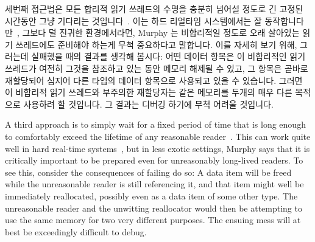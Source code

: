 세번째 접근법은 모든 합리적 읽기 쓰레드의 수명을 충분히 넘어설 정도로 긴 고정된
시간동안 그냥 기다리는 것입니다~\cite{Jacobson93,AjuJohn95}.
이는 하드 리얼타임 시스템에서는 잘 동작합니다만~\cite{YuxinRen2018RTRCU},
그보다 덜 진귀한 환경에서라면, Murphy 는 비합리적일 정도로 오래 살아있는 읽기
쓰레드에도 준비해야 하는게 무척 중요하다고 말합니다.
이를 자세히 보기 위해, 그러는데 실패했을 때의 결과를 생각해 봅시다:
어떤 데이터 항목은 이 비합리적인 읽기 쓰레드가 여전히 그것을 참조하고 있는 동안
메모리 해제될 수 있고, 그 항목은 곧바로 재할당되어 심지어 다른 타입의 데이터
항목으로 사용되고 있을 수 있습니다.
그러면 이 비합리적 읽기 쓰레드와 부주의한 재할당자는 같은 메모리를 두개의 매우
다른 목적으로 사용하려 할 것입니다.
그 결과는 디버깅 하기에 무척 어려울 것입니다.

\iffalse

A third approach is to simply wait for a fixed period of time that is
long enough to comfortably exceed the lifetime of any reasonable
reader~\cite{Jacobson93,AjuJohn95}.
This can work quite well in hard real-time systems~\cite{YuxinRen2018RTRCU},
but in less exotic
settings, Murphy says that it is critically important to be prepared
even for unreasonably long-lived readers.
To see this, consider the consequences of failing do so:
A data item will be freed while the unreasonable reader is still
referencing it, and that item might well be immediately reallocated,
possibly even as a data item of some other type.
The unreasonable reader and the unwitting reallocator would then
be attempting to use the same memory for two very different purposes.
The ensuing mess will at best be exceedingly difficult to debug.

